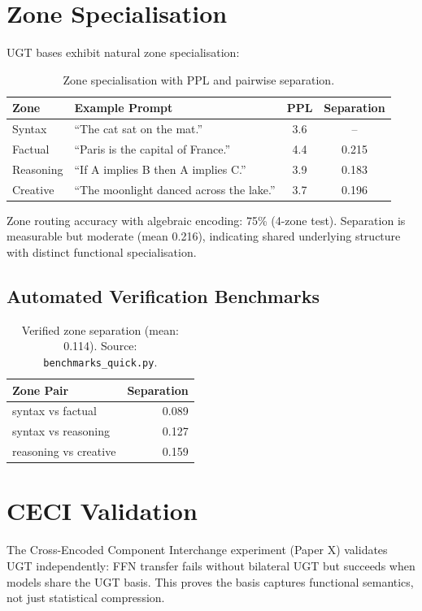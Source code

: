 \documentclass[11pt]{article}
\begin{document}
\section{Zone Specialisation}

UGT bases exhibit natural zone specialisation:

\begin{table}[h]
\centering
\begin{tabular}{llcc}
\toprule
Zone & Example Prompt & PPL & Separation \\
\midrule
Syntax & ``The cat sat on the mat.'' & 3.6 & -- \\
Factual & ``Paris is the capital of France.'' & 4.4 & 0.215 \\
Reasoning & ``If A implies B then A implies C.'' & 3.9 & 0.183 \\
Creative & ``The moonlight danced across the lake.'' & 3.7 & 0.196 \\
\bottomrule
\end{tabular}
\caption{Zone specialisation with PPL and pairwise separation.}
\end{table}

Zone routing accuracy with algebraic encoding: 75\% (4-zone test). Separation is measurable but moderate (mean 0.216), indicating shared underlying structure with distinct functional specialisation.

\subsection{Automated Verification Benchmarks}

\begin{table}[h]
\centering
\begin{tabular}{lr}
\toprule
Zone Pair & Separation \\
\midrule
syntax vs factual & 0.089 \\
syntax vs reasoning & 0.127 \\
reasoning vs creative & 0.159 \\
\bottomrule
\end{tabular}
\caption{Verified zone separation (mean: 0.114). Source: \texttt{benchmarks\_quick.py}.}
\end{table}


\section{CECI Validation}

The Cross-Encoded Component Interchange experiment (Paper X) validates UGT independently: FFN transfer fails without bilateral UGT but succeeds when models share the UGT basis. This proves the basis captures functional semantics, not just statistical compression.
\end{document}

